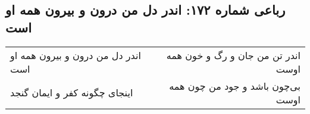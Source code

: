 \begin{center}
\section*{رباعی شماره ۱۷۲: اندر دل من درون و بیرون همه او است}
\label{sec:0172}
\begin{longtable}{l p{0.5cm} r}
اندر دل من درون و بیرون همه او است
&&
اندر تن من جان و رگ و خون همه اوست
\\
اینجای چگونه کفر و ایمان گنجد
&&
بی‌چون باشد و جود من چون همه اوست
\\
\end{longtable}
\end{center}
